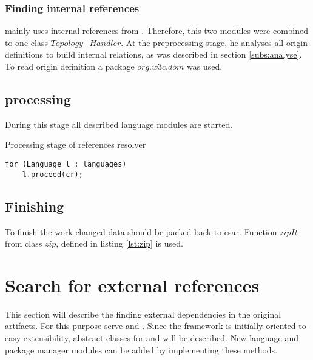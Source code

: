 \subsubsection*{Finding internal references}\label{subs:imp_findintref}
 mainly uses internal references from .
Therefore, this two modules were combined to one class $Topology$\_$Handler$.	
At the preprocessing stage, he analyses all origin definitions to build internal relations, as was described in section \ref{subs:analyse}.
To read origin definition a package $org$.$w3c$.$dom$ was used.

\subsection*{processing}
During this stage all described language modules are started.
\begin{Listing}
\caption{Processing stage of references resolver}
\label{lst:start_lang}
\begin{lstlisting}
for (Language l : languages)
	l.proceed(cr);
\end{lstlisting}
\end{Listing}


\subsection*{Finishing}
To finish the work changed data should be packed back to \gls{csar}.
Function $zipIt$ from class $zip$, defined in listing \ref{lst:zip} is used.


\section{Search for external references}
This section will describe the finding external dependencies in the original artifacts.
For this purpose serve  and .
Since the framework is initially oriented to easy extensibility, abstract classes for  and  will be described.
New language and package manager modules can be added by implementing these methods.

